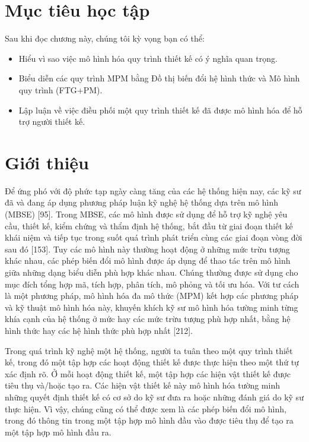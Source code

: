 \section*{Mục tiêu học tập}
Sau khi đọc chương này, chúng tôi kỳ vọng bạn có thể:
\begin{itemize}
\item Hiểu vì sao việc mô hình hóa quy trình thiết kế có ý nghĩa quan trọng.
\item Biểu diễn các quy trình MPM bằng Đồ thị biến đổi hệ hình thức và Mô hình quy trình (FTG+PM).
\item Lập luận về việc điều phối một quy trình thiết kế đã được mô hình hóa để hỗ trợ người thiết kế.
\end{itemize}

\section{Giới thiệu}
Để ứng phó với độ phức tạp ngày càng tăng của các hệ thống hiện nay, các kỹ sư đã và đang áp dụng phương pháp luận kỹ nghệ hệ thống dựa trên mô hình (MBSE) [95]. Trong MBSE, các mô hình được sử dụng để hỗ trợ kỹ nghệ yêu cầu,
thiết kế, kiểm chứng và thẩm định hệ thống, bắt đầu từ giai đoạn thiết kế khái niệm và tiếp tục trong suốt quá trình phát triển cùng các giai đoạn vòng đời sau đó [153]. Tuy các mô hình này thường hoạt động ở những mức trừu tượng khác nhau, các phép biến đổi mô hình được áp dụng để thao tác trên mô hình giữa những dạng biểu diễn phù hợp khác nhau. Chúng thường được sử dụng cho mục đích tổng hợp mã, tích hợp, phân tích, mô phỏng và tối ưu hóa. Với tư cách là một phương pháp, mô hình hóa đa mô thức (MPM) kết hợp các phương pháp và kỹ thuật mô hình hóa này, khuyến khích kỹ sư mô hình hóa tường minh từng khía cạnh của hệ thống ở mức hay các mức trừu tượng phù hợp nhất, bằng hệ hình thức hay các hệ hình thức phù hợp nhất [212].

Trong quá trình kỹ nghệ một hệ thống, người ta tuân theo một quy trình thiết kế, trong đó một tập hợp các hoạt động thiết kế được thực hiện theo một thứ tự xác định rõ. Ở mỗi hoạt động thiết kế, một tập hợp các hiện vật thiết kế được tiêu thụ và/hoặc tạo ra. Các hiện vật thiết kế này mô hình hóa tường minh những quyết định thiết kế có cơ sở do kỹ sư đưa ra hoặc những đánh giá do kỹ sư thực hiện. Vì vậy, chúng cũng có thể được xem là các phép biến đổi mô hình, trong đó thông tin trong một tập hợp mô hình đầu vào được tiêu thụ để tạo ra một tập hợp mô hình đầu ra.


